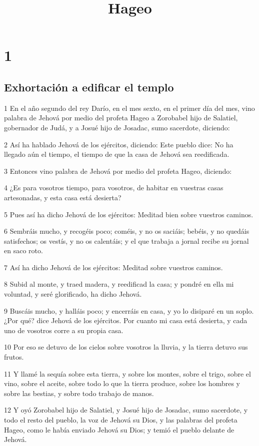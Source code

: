 

\title{Hageo}

\chapter{1}

\section*{Exhortación a edificar el templo}

\par 1 En el año segundo del rey Darío, en el mes sexto, en el primer día del mes, vino palabra de Jehová por medio del profeta Hageo a Zorobabel hijo de Salatiel, gobernador de Judá, y a Josué hijo de Josadac, sumo sacerdote, diciendo:
\par 2 Así ha hablado Jehová de los ejércitos, diciendo: Este pueblo dice: No ha llegado aún el tiempo, el tiempo de que la casa de Jehová sea reedificada.
\par 3 Entonces vino palabra de Jehová por medio del profeta Hageo, diciendo:
\par 4 ¿Es para vosotros tiempo, para vosotros, de habitar en vuestras casas artesonadas, y esta casa está desierta?
\par 5 Pues así ha dicho Jehová de los ejércitos: Meditad bien sobre vuestros caminos.
\par 6 Sembráis mucho, y recogéis poco; coméis, y no os saciáis; bebéis, y no quedáis satisfechos; os vestís, y no os calentáis; y el que trabaja a jornal recibe su jornal en saco roto.
\par 7 Así ha dicho Jehová de los ejércitos: Meditad sobre vuestros caminos.
\par 8 Subid al monte, y traed madera, y reedificad la casa; y pondré en ella mi voluntad, y seré glorificado, ha dicho Jehová.
\par 9 Buscáis mucho, y halláis poco; y encerráis en casa, y yo lo disiparé en un soplo. ¿Por qué? dice Jehová de los ejércitos. Por cuanto mi casa está desierta, y cada uno de vosotros corre a su propia casa.
\par 10 Por eso se detuvo de los cielos sobre vosotros la lluvia, y la tierra detuvo sus frutos.
\par 11 Y llamé la sequía sobre esta tierra, y sobre los montes, sobre el trigo, sobre el vino, sobre el aceite, sobre todo lo que la tierra produce, sobre los hombres y sobre las bestias, y sobre todo trabajo de manos.
\par 12 Y oyó Zorobabel hijo de Salatiel, y Josué hijo de Josadac, sumo sacerdote, y todo el resto del pueblo, la voz de Jehová su Dios, y las palabras del profeta Hageo, como le había enviado Jehová su Dios; y temió el pueblo delante de Jehová.

